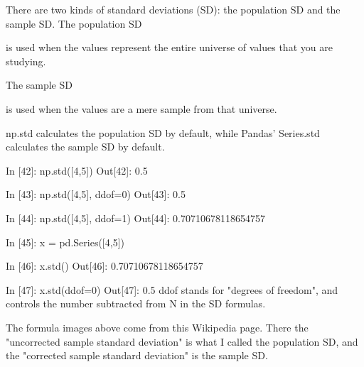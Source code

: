 There are two kinds of standard deviations (SD): the population SD and the sample SD.
The population SD



is used when the values represent the entire universe of values that you are studying.

The sample SD



is used when the values are a mere sample from that universe.

np.std calculates the population SD by default, while Pandas' Series.std calculates the sample SD by default.

In [42]: np.std([4,5])
Out[42]: 0.5

In [43]: np.std([4,5], ddof=0)
Out[43]: 0.5

In [44]: np.std([4,5], ddof=1)
Out[44]: 0.70710678118654757

In [45]: x = pd.Series([4,5])

In [46]: x.std()
Out[46]: 0.70710678118654757

In [47]: x.std(ddof=0)
Out[47]: 0.5
ddof stands for "degrees of freedom", and controls the number subtracted from N in the SD formulas.

The formula images above come from this Wikipedia page. There the "uncorrected sample standard deviation" is what I called the population SD, and the "corrected sample standard deviation" is the sample SD.

